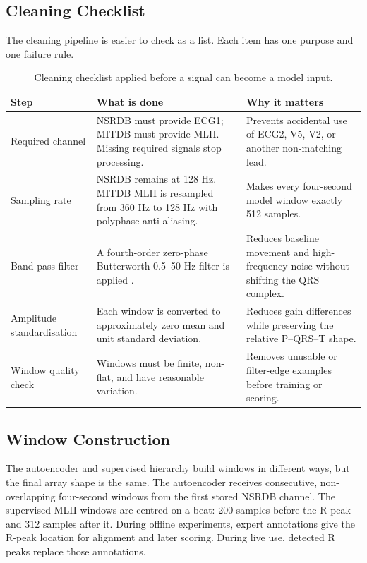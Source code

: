 \subsection{Cleaning Checklist}

The cleaning pipeline is easier to check as a list. Each item has one purpose
and one failure rule.

\begin{table}[H]
\centering
\small
\caption{Cleaning checklist applied before a signal can become a model input.}
\label{tab:data-cleaning-checklist}
\begin{tabular}{>{\raggedright\arraybackslash}p{2.6cm}>{\raggedright\arraybackslash}p{5.0cm}>{\raggedright\arraybackslash}p{4.3cm}}
\toprule
Step & What is done & Why it matters\\
\midrule
Required channel & NSRDB must provide ECG1; MITDB must provide MLII. Missing
required signals stop processing. & Prevents accidental use of ECG2, V5, V2, or
another non-matching lead.\\
\addlinespace
Sampling rate & NSRDB remains at 128 Hz. MITDB MLII is resampled from 360 Hz to
128 Hz with polyphase anti-aliasing. & Makes every four-second model window
exactly 512 samples.\\
\addlinespace
Band-pass filter & A fourth-order zero-phase Butterworth 0.5--50 Hz filter is
applied \cite{butterworth1930filter,virtanen2020scipy}. & Reduces baseline
movement and high-frequency noise without shifting the QRS complex.\\
\addlinespace
Amplitude standardisation & Each window is converted to approximately zero mean
and unit standard deviation. & Reduces gain differences while preserving the
relative P--QRS--T shape.\\
\addlinespace
Window quality check & Windows must be finite, non-flat, and have reasonable
variation. & Removes unusable or filter-edge examples before training or
scoring.\\
\bottomrule
\end{tabular}
\end{table}

\subsection{Window Construction}

The autoencoder and supervised hierarchy build windows in different ways, but
the final array shape is the same. The autoencoder receives consecutive,
non-overlapping four-second windows from the first stored NSRDB channel. The
supervised MLII windows are centred on a beat: 200 samples before the R peak
and 312 samples after it. During offline experiments, expert annotations give
the R-peak location for alignment and later scoring. During live use, detected
R peaks replace those annotations.


